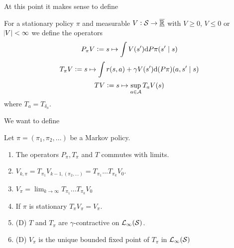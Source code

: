 
At this point it makes sense to define

\begin{defn}
  For a stationary policy $\pi$ and measurable $V:\mathcal{S} \to \overline{\underline{\mathbb{R}}}$
  with $V \geq 0$, $V \leq 0$ or $\abs{V} < \infty$
  we define the operators 
  \[ P_\pi V \vcentcolon= s \mapsto \int V(s') \mathrm{d} P\pi(s' \mid s) \]
  \[ T_\pi V \vcentcolon= s \mapsto \int r(s, a)
  + \gamma V(s') \mathrm{d} (P \pi)(a, s'\mid s) \]
  \[ T V \vcentcolon= s \mapsto \sup_{a \in \mathcal{A}} T_a V(s) \]
  where $T_a = T_{\delta_a}$.
\end{defn}

We want to define

\begin{prop}
  Let $\pi = (\pi_1, \pi_2, \dots)$ be a Markov policy.
  \begin{enumerate}
    \item The operators $P_\pi, T_\pi$ and $T$ commutes with limits.
    \item $V_{k, \pi} = T_{\pi_1} V_{k-1, (\pi_2, \dots)}
      = T_{\pi_1} \dots T_{\pi_k} V_0$.
    \item $V_\pi = \lim_{k \to \infty} T_{\pi_1} \dots T_{\pi_k} V_0$
    \item If $\pi$ is stationary $T_\pi V_\pi = V_\pi$.
    \item (D) $T$ and $T_\pi$ are $\gamma$-contractive
      on $\mathcal{L}_\infty(\mathcal{S})$.
    \item (D) $V_\pi$ is the unique bounded fixed point of $T_\pi$
      in $\mathcal{L}_\infty(\mathcal{S})$
  \end{enumerate} 
  \label{prop:propTV}
\end{prop}

